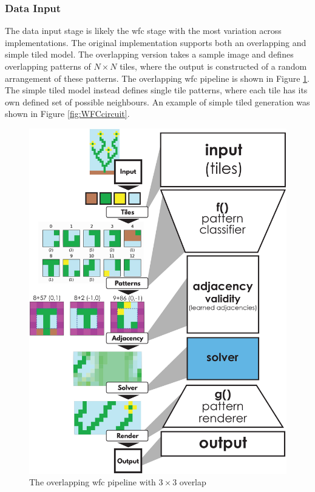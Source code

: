 \subsubsection{Data Input}
The data input stage is likely the \acrshort{wfc} stage with the most variation across implementations. The original implementation \cite{Gumin_Wave_Function_Collapse_2016} supports both an overlapping and simple tiled model. The overlapping version takes a sample image and defines overlapping patterns of \(N\times N\) tiles, where the output is constructed of a random arrangement of these patterns. The overlapping \acrshort{wfc} pipeline is shown in Figure \ref{fig:overlappingWFC}. The simple tiled model instead defines single tile patterns, where each tile has its own defined set of possible neighbours. An example of simple tiled generation was shown in Figure \ref{fig:WFCcircuit}.

\begin{figure}[H]
    \centering
    \includegraphics[width=\textwidth, height=0.5\textheight, keepaspectratio]{Images/OverlappingWFC.jpg}
    \caption{The overlapping \acrshort{wfc} pipeline with \(3\times 3\) overlap \cite{WFC_ConstraintSolving_and_ML}}
    \label{fig:overlappingWFC}
\end{figure}

